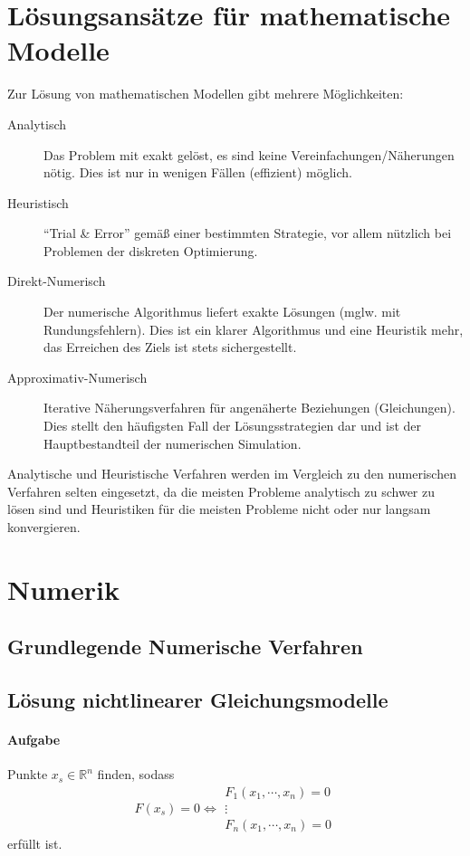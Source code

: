 \section{Lösungsansätze für mathematische Modelle} %
	Zur Lösung von mathematischen Modellen gibt mehrere Möglichkeiten:
	\begin{description}
		\item[Analytisch] Das Problem mit exakt gelöst, es sind keine Vereinfachungen/Näherungen nötig. Dies ist nur in wenigen Fällen (effizient) möglich.
		\item[Heuristisch] \enquote{Trial \& Error} gemäß einer bestimmten Strategie, vor allem nützlich bei Problemen der diskreten Optimierung.
		\item[Direkt-Numerisch] Der numerische Algorithmus liefert exakte Lösungen (mglw. mit Rundungsfehlern). Dies ist ein klarer Algorithmus und eine Heuristik mehr, das Erreichen des Ziels ist stets sichergestellt.
		\item[Approximativ-Numerisch] Iterative Näherungsverfahren für angenäherte Beziehungen (Gleichungen). Dies stellt den häufigsten Fall der Lösungsstrategien dar und ist der Hauptbestandteil der numerischen Simulation.
	\end{description}

	Analytische und Heuristische Verfahren werden im Vergleich zu den numerischen Verfahren selten eingesetzt, da die meisten Probleme analytisch zu schwer zu lösen sind und Heuristiken für die meisten Probleme nicht oder nur langsam konvergieren.

\section{Numerik} %
	\subsection{Grundlegende Numerische Verfahren}


	\subsection{Lösung nichtlinearer Gleichungsmodelle} %
		\paragraph{Aufgabe}
			Punkte \( x _ s \in \mathbb{R} ^ n \) finden, sodass
			\begin{equation*}
				F(x _ s) = 0 \iff
				\begin{matrix}
					F _ 1 (x _ 1, \cdots, x _ n) = 0 \\
					\vdots                           \\
					F _ n (x _ 1, \cdots, x _ n) = 0
				\end{matrix}
			\end{equation*}
			erfüllt ist.

